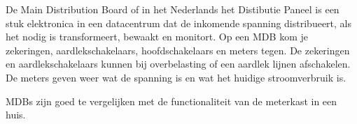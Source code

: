 De Main Distribution Board of in het Nederlands het Distibutie Paneel is een stuk elektronica in een datacentrum dat de inkomende spanning distribueert, als het nodig is transformeert, bewaakt en monitort. Op een MDB kom je zekeringen, aardlekschakelaars, hoofdschakelaars en meters tegen. De zekeringen en aardlekschakelaars kunnen bij overbelasting of een aardlek lijnen afschakelen. De meters geven weer wat de spanning is en wat het huidige stroomverbruik is.

MDBs zijn goed te vergelijken met de functionaliteit van de meterkast in een huis.
